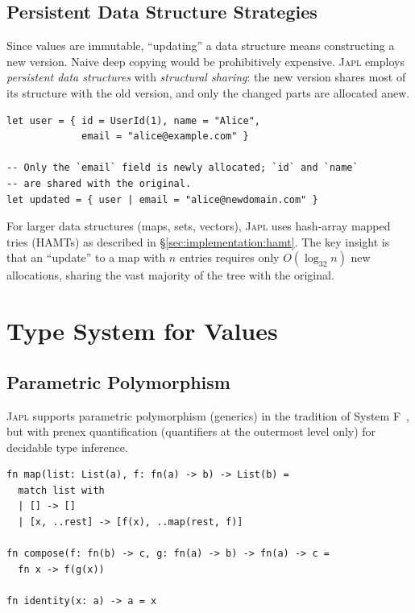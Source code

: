 \documentclass[11pt]{article}
\theoremstyle{definition}
\theoremstyle{remark}
\newcommand{\japl}{\textsc{Japl}}
\begin{document}
\subsection{Persistent Data Structure Strategies}
\label{sec:japl:persistent}

Since values are immutable, ``updating'' a data structure means
constructing a new version.  Naive deep copying would be prohibitively
expensive.  \japl{} employs \emph{persistent data structures} with
\emph{structural sharing}: the new version shares most of its structure
with the old version, and only the changed parts are allocated anew.

\begin{lstlisting}[caption={Structural sharing in record updates.}]
let user = { id = UserId(1), name = "Alice",
             email = "alice@example.com" }

-- Only the `email` field is newly allocated; `id` and `name`
-- are shared with the original.
let updated = { user | email = "alice@newdomain.com" }
\end{lstlisting}

For larger data structures (maps, sets, vectors), \japl{} uses
hash-array mapped tries (HAMTs) as described in
\S\ref{sec:implementation:hamt}.  The key insight is that an ``update''
to a map with $n$ entries requires only $O(\log_{32} n)$ new
allocations, sharing the vast majority of the tree with the original.


\section{Type System for Values}
\label{sec:type-system}

\subsection{Parametric Polymorphism}
\label{sec:type-system:poly}

\japl{} supports parametric polymorphism (generics) in the tradition
of System F~\cite{girard1972interpretation,reynolds1974towards}, but
with prenex quantification (quantifiers at the outermost level only)
for decidable type inference.

\begin{lstlisting}[caption={Parametric polymorphism in \japl{}.}]
fn map(list: List(a), f: fn(a) -> b) -> List(b) =
  match list with
  | [] -> []
  | [x, ..rest] -> [f(x), ..map(rest, f)]

fn compose(f: fn(b) -> c, g: fn(a) -> b) -> fn(a) -> c =
  fn x -> f(g(x))

fn identity(x: a) -> a = x
\end{lstlisting}
\end{document}
